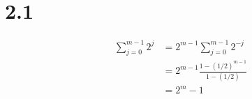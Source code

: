 \documentclass{article}
\begin{document}
\section{2.1}
    \begin{equation}
        \begin{split}
            \sum_{j=0}^{m-1} 2^{j}  &= 2^{m-1}\sum_{j=0}^{m-1} 2^{-j} \\
                                    &= 2^{m-1}\frac{1-(1/2)^{m-1}}{1-(1/2)} \\
                                    &= 2^{m} - 1 \\      
        \end{split}
    \end{equation}
\end{document}
